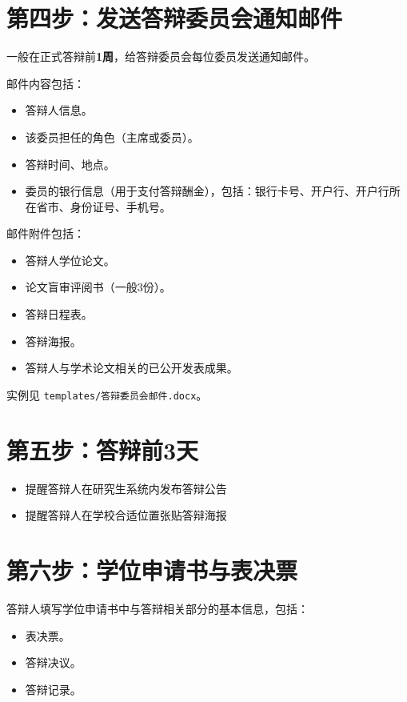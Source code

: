 \documentclass[12pt,a4paper,openany]{ctexbook}
\newcommand{\todoitem}[1]{\item[\textcolor{lzublue}{$\square$}] #1}
\begin{document}
\section{第四步：发送答辩委员会通知邮件}

一般在正式答辩前\textbf{1周}，给答辩委员会每位委员发送通知邮件。

邮件内容包括：
\begin{itemize}
  \item 答辩人信息。
  \item 该委员担任的角色（主席或委员）。
  \item 答辩时间、地点。
  \item 委员的银行信息（用于支付答辩酬金），包括：银行卡号、开户行、开户行所在省市、身份证号、手机号。
\end{itemize}

邮件附件包括：
\begin{itemize}
  \item 答辩人学位论文。
  \item 论文盲审评阅书（一般3份）。
  \item 答辩日程表。
  \item 答辩海报。
  \item 答辩人与学术论文相关的已公开发表成果。
\end{itemize}

实例见 \texttt{templates/答辩委员会邮件.docx}。

\section{第五步：答辩前3天}

\begin{itemize}
  \todoitem{提醒答辩人在研究生系统内发布答辩公告}
  \todoitem{提醒答辩人在学校合适位置张贴答辩海报}
\end{itemize}

\section{第六步：学位申请书与表决票}

答辩人填写学位申请书中与答辩相关部分的基本信息，包括：

\begin{itemize}
  \item 表决票。
  \item 答辩决议。
  \item 答辩记录。
\end{itemize}
\end{document}
